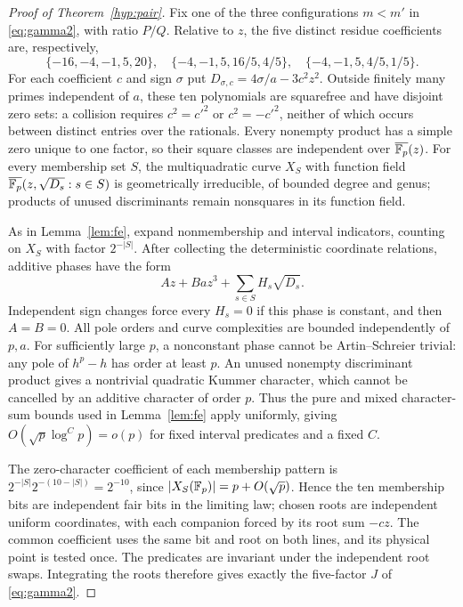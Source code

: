 

\begin{proof}[Proof of Theorem~\ref{hyp:pair}]
Fix one of the three configurations $m<m'$ in \eqref{eq:gamma2}, with ratio $P/Q$.
Relative to $z$, the five distinct residue coefficients are, respectively,
\[
 \{-16,-4,-1,5,20\},\quad
 \{-4,-1,5,16/5,4/5\},\quad
 \{-4,-1,5,4/5,1/5\}.
\]
For each coefficient $c$ and sign $\sigma$ put $D_{\sigma,c}=4\sigma/a-3c^2z^2$.
Outside finitely many primes independent of $a$, these ten polynomials are squarefree and have disjoint zero sets:
a collision requires $c^2=c'^2$ or $c^2=-c'^2$, neither of which occurs between distinct entries over the rationals.
Every nonempty product has a simple zero unique to one factor, so their square classes are independent over $\overline{\mathbb{F}_p}(z)$.
For every membership set $S$, the multiquadratic curve $X_S$ with function field
$\overline{\mathbb{F}_p}(z,\sqrt{D_s}:s\in S)$ is geometrically irreducible, of bounded degree and genus;
products of unused discriminants remain nonsquares in its function field.

As in Lemma~\ref{lem:fe}, expand nonmembership and interval indicators, counting on $X_S$ with factor $2^{-|S|}$.
After collecting the deterministic coordinate relations, additive phases have the form
\[
 Az+Baz^3+\sum_{s\in S}H_s\sqrt{D_s}.
\]
Independent sign changes force every $H_s=0$ if this phase is constant, and then $A=B=0$.
All pole orders and curve complexities are bounded independently of $p,a$.  For sufficiently large $p$, a nonconstant phase
cannot be Artin--Schreier trivial: any pole of $h^p-h$ has order at least $p$.
An unused nonempty discriminant product gives a nontrivial quadratic Kummer character, which cannot be cancelled by an
additive character of order $p$.  Thus the pure and mixed character-sum bounds used in Lemma~\ref{lem:fe}
apply uniformly, giving $O(\sqrt p\log^C p)=o(p)$ for fixed interval predicates and a fixed $C$.

The zero-character coefficient of each membership pattern is
$2^{-|S|}2^{-(10-|S|)}=2^{-10}$, since $|X_S(\mathbb{F}_p)|=p+O(\sqrt p)$.
Hence the ten membership bits are independent fair bits in the limiting law; chosen roots are independent uniform
coordinates, with each companion forced by its root sum $-cz$.  The common coefficient uses the same bit and root
on both lines, and its physical point is tested once.  The predicates are invariant under the independent root swaps.
Integrating the roots therefore gives exactly the five-factor $J$ of \eqref{eq:gamma2}.


\end{proof}
